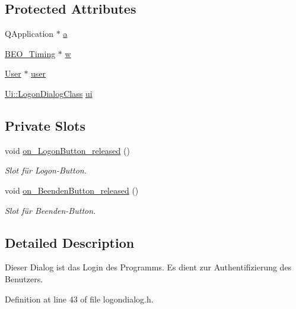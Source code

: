 \subsection*{Protected Attributes}
\begin{CompactItemize}
\item 
QApplication $\ast$ \hyperlink{class_logon_dialog_cc6f7b558e791bdb79d0c522209306c2}{a}
\item 
\hyperlink{class_b_e_o___timing}{BEO\_\-Timing} $\ast$ \hyperlink{class_logon_dialog_1c32b591de3a058059ed985b5f470ca0}{w}
\item 
\hyperlink{class_user}{User} $\ast$ \hyperlink{class_logon_dialog_60af9ce2cb403ef6ae38953b9c78e2ee}{user}
\item 
\hyperlink{class_ui_1_1_logon_dialog_class}{Ui::LogonDialogClass} \hyperlink{class_logon_dialog_24dfce9f2459f2c66f09a430d8baf907}{ui}
\end{CompactItemize}
\subsection*{Private Slots}
\begin{CompactItemize}
\item 
void \hyperlink{class_logon_dialog_458c87e2493dd7421792e8141e65c5dd}{on\_\-LogonButton\_\-released} ()
\begin{CompactList}\small\item\em Slot für Logon-Button. \item\end{CompactList}\item 
void \hyperlink{class_logon_dialog_6c66e4cb7c567b47f544080ae148b0b3}{on\_\-BeendenButton\_\-released} ()
\begin{CompactList}\small\item\em Slot für Beenden-Button. \item\end{CompactList}\end{CompactItemize}


\subsection{Detailed Description}
Dieser Dialog ist das Login des Programms. Es dient zur Authentifizierung des Benutzers. 

Definition at line 43 of file logondialog.h.

